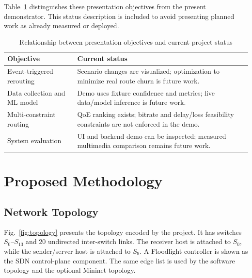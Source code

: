 \documentclass[conference]{IEEEtran}
\begin{document}
Table~\ref{tab:objective_status} distinguishes these presentation objectives from the present demonstrator. This status description is included to avoid presenting planned work as already measured or deployed.
\begin{table}[t]
\centering
\caption{Relationship between presentation objectives and current project status}
\label{tab:objective_status}
\begin{tabular}{@{}p{}p{}@{}}
\toprule
Objective & Current status \\
\midrule
Event-triggered rerouting & Scenario changes are visualized; optimization to minimize real route churn is future work. \\
Data collection and ML model & Demo uses fixture confidence and metrics; live data/model inference is future work. \\
Multi-constraint routing & QoE ranking exists; bitrate and delay/loss feasibility constraints are not enforced in the demo. \\
System evaluation & UI and backend demo can be inspected; measured multimedia comparison remains future work. \\
\bottomrule
\end{tabular}
\end{table}

\section{Proposed Methodology}
\subsection{Network Topology}
Fig.~\ref{fig:topology} presents the topology encoded by the project. It has switches $S_0$--$S_{13}$ and 20 undirected inter-switch links. The receiver host is attached to $S_0$, while the sender/server host is attached to $S_9$. A Floodlight controller is shown as the SDN control-plane component. The same edge list is used by the software topology and the optional Mininet topology.
\end{document}
